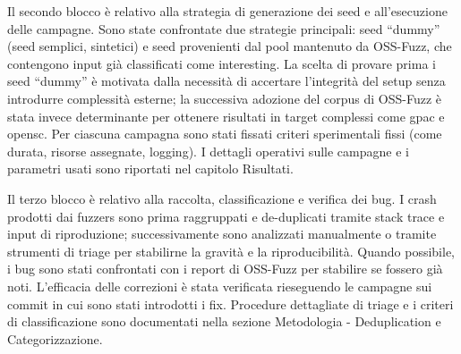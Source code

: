 Il secondo blocco è relativo alla strategia di generazione dei seed e all’esecuzione delle campagne.
Sono state confrontate due strategie principali: seed “dummy” (seed semplici, sintetici) e seed provenienti dal pool mantenuto da OSS-Fuzz, che contengono input già classificati come interesting. 
La scelta di provare prima i seed “dummy” è motivata dalla necessità di accertare l’integrità del setup senza introdurre complessità esterne; la successiva adozione del corpus di OSS-Fuzz è stata invece determinante per ottenere risultati in target complessi come gpac e opensc.
Per ciascuna campagna sono stati fissati criteri sperimentali fissi (come durata, risorse assegnate, logging).
I dettagli operativi sulle campagne e i parametri usati sono riportati nel capitolo Risultati.

Il terzo blocco è relativo alla raccolta, classificazione e verifica dei bug. I crash prodotti dai fuzzers sono prima raggruppati e de-duplicati tramite stack trace e input di riproduzione; successivamente sono analizzati manualmente o tramite strumenti di triage per stabilirne la gravità e la riproducibilità. Quando possibile, i bug sono stati confrontati con i report di OSS-Fuzz per stabilire se fossero già noti. L’efficacia delle correzioni è stata verificata rieseguendo le campagne sui commit in cui sono stati introdotti i fix.
Procedure dettagliate di triage e i criteri di classificazione sono documentati nella sezione Metodologia - Deduplication e Categorizzazione.
